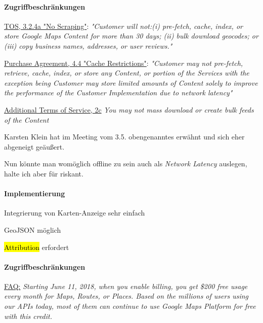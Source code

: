 \documentclass[11pt]{article} %
\begin{document}
\paragraph{Zugriffbeschränkungen}
\begin{cptitemize} 
  	 \item \href{https://cloud.google.com/maps-platform/terms/}{TOS, 3.2.4a "No Scraping"}: \textit{"Customer will not:(i) pre-fetch, cache, index, or store Google Maps Content for more than 30 days; (ii) bulk download geocodes; or (iii) copy business names, addresses, or user reviews."}
  	 \item \href{https://enterprise.google.com/maps/terms/us/maps_purchase_agreement.html}{Purchase Agreement, 4.4 "Cache Restrictions"}: \textit{"Customer may not pre-fetch, retrieve, cache, index, or store any Content, or portion of the Services with the exception being Customer may store limited amounts of Content solely to improve the performance of the Customer Implementation due to network latency"}
  	 \item \href{}{Additional Terms of Service, 2c} \textit{You may not mass download or create bulk feeds of the Content}
  	 \item Karsten Klein hat im Meeting vom 3.5. obengenanntes erwähnt und sich eher abgeneigt geäußert.
  	 \item Nun könnte man womöglich offline zu sein auch als \textit{Network Latency} auslegen, halte ich aber für riskant. 
 \end{cptitemize}  
 
 \paragraph{Implementierung}
 \begin{cptitemize} 
 	\item Integrierung von Karten-Anzeige sehr einfach
   	 \item GeoJSON möglich 
   	 \item \hl{Attribution} erfordert
  \end{cptitemize}  

  \paragraph{Zugriffbeschränkungen}
  \begin{cptitemize} 
    	 \item \href{https://cloud.google.com/maps-platform/pricing/}{FAQ:} \textit{Starting June 11, 2018, when you enable billing, you get \$200 free usage every month for Maps, Routes, or Places. Based on the millions of users using our APIs today, most of them can continue to use Google Maps Platform for free with this credit. } 
   \end{cptitemize}  
\end{document}
